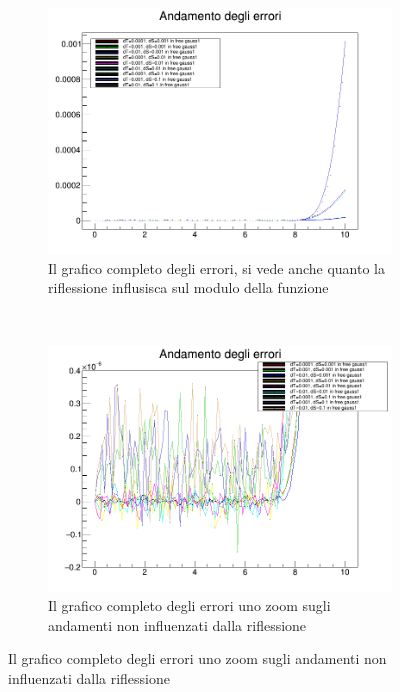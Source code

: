 \begin{figure}[h]
\centering
\begin{subfigure}[b]{0.49\textwidth}
\includegraphics[width=\linewidth]{IMG/e_g1full}
\caption[Errori completo]{Il grafico completo degli errori, si vede anche quanto la riflessione influsisca sul modulo della funzione}\label{fig:fullErr}
\end{subfigure}
~
\begin{subfigure}[b]{0.49\textwidth}
	\includegraphics[width=\linewidth]{IMG/e_g1res}
	\caption[Errori zoom]{Il grafico completo degli errori uno zoom sugli andamenti non influenzati dalla riflessione}\label{fig:fullErrzoom}
\end{subfigure}
\end{figure}

